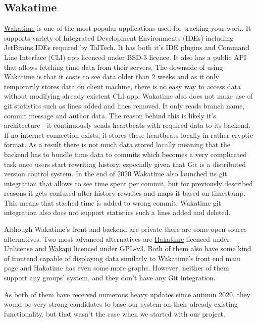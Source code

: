 \subsection{Wakatime}\label{subsec:wakatime}
\href{https://wakatime.com/about}{Wakatime} is one of the most popular applications used for tracking your work.
It supports variety of Integrated Development Environments (IDEs) including JetBrains IDEs required by TalTech.
It has both it's IDE plugins and Command Line Interface (CLI) app licenced under BSD-3 licence.
It also has a public API that allows fetching time data from their servers.
The downside of using Wakatime is that it costs to see data older than 2 weeks and as it only temporarily
stores data on client machine, there is no easy way to access data without modifying already existent CLI app.
Wakatime also does not make use of git statistics such as lines added and lines removed.
It only reads branch name, commit message and author data.
The reason behind this is likely it's architecture - it continuously sends heartbeats with required data to its backend.
If no internet connection exists, it stores these heartbeats locally in rather cryptic format.
As a result there is not much data stored locally meaning that the backend has to bundle time data to commits which becomes a very complicated task
once users start rewriting history, especially given that Git is a distributed version control system.
In the end of 2020 Wakatime also launched its git integration that allows to see time spent per commit, but for previously
described reasons it gets confused after history rewrites and maps it based on timestamp.
This means that stashed time is added to wrong commit.
Wakatime git integration also does not support statistics such a lines added and deleted.

Although Wakatime's front and backend are private there are some open source alternatives.
Two most advanced alternatives are \href{https://github.com/mujx/hakatime}{Hakatime} licenced under Unlicense and
\href{https://github.com/muety/wakapi}{Wakapi} licenced under GPL-v3.
Both of them also have some kind of frontend capable of displaying data similarly to Wakatime's front end main page and
Hakatime has even some more graphs.
However, neither of them support any groups' system, and they don't have any Git integration.

As both of them have received numerous heavy updates since autumn 2020, they would be very strong candidates to base
our system on their already existing functionality, but that wasn't the case when we started with our project.



